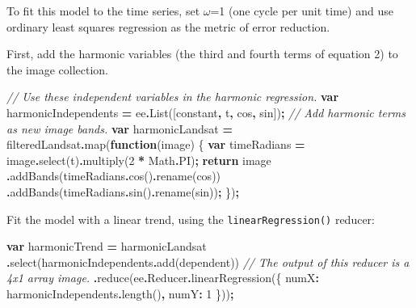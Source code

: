 \documentclass[
]{article}
\newenvironment{Shaded}{\begin{snugshade}}{\end{snugshade}}
\newcommand{\AttributeTok}[1]{\textcolor[rgb]{0.77,0.63,0.00}{#1}}
\newcommand{\BuiltInTok}[1]{#1}
\newcommand{\CommentTok}[1]{\textcolor[rgb]{0.56,0.35,0.01}{\textit{#1}}}
\newcommand{\ConstantTok}[1]{\textcolor[rgb]{0.00,0.00,0.00}{#1}}
\newcommand{\ControlFlowTok}[1]{\textcolor[rgb]{0.13,0.29,0.53}{\textbf{#1}}}
\newcommand{\DataTypeTok}[1]{\textcolor[rgb]{0.13,0.29,0.53}{#1}}
\newcommand{\DecValTok}[1]{\textcolor[rgb]{0.00,0.00,0.81}{#1}}
\newcommand{\FunctionTok}[1]{\textcolor[rgb]{0.00,0.00,0.00}{#1}}
\newcommand{\KeywordTok}[1]{\textcolor[rgb]{0.13,0.29,0.53}{\textbf{#1}}}
\newcommand{\NormalTok}[1]{#1}
\newcommand{\OperatorTok}[1]{\textcolor[rgb]{0.81,0.36,0.00}{\textbf{#1}}}
\newcommand{\StringTok}[1]{\textcolor[rgb]{0.31,0.60,0.02}{#1}}
\begin{document}
To fit this model to the time series, set \(\omega\)=1 (one cycle per unit time) and use ordinary least squares regression as the metric of error reduction.

First, add the harmonic variables (the third and fourth terms of equation 2) to the image collection.

\begin{Shaded}
\begin{Highlighting}[]
\CommentTok{// Use these independent variables in the harmonic regression.}
\KeywordTok{var}\NormalTok{ harmonicIndependents }\OperatorTok{=}\NormalTok{ ee}\OperatorTok{.}\FunctionTok{List}\NormalTok{([}\StringTok{\textquotesingle{}constant\textquotesingle{}}\OperatorTok{,} \StringTok{\textquotesingle{}t\textquotesingle{}}\OperatorTok{,} \StringTok{\textquotesingle{}cos\textquotesingle{}}\OperatorTok{,} \StringTok{\textquotesingle{}sin\textquotesingle{}}\NormalTok{])}\OperatorTok{;}
\CommentTok{// Add harmonic terms as new image bands.}
\KeywordTok{var}\NormalTok{ harmonicLandsat }\OperatorTok{=}\NormalTok{ filteredLandsat}\OperatorTok{.}\FunctionTok{map}\NormalTok{(}\KeywordTok{function}\NormalTok{(image) \{}
  \KeywordTok{var}\NormalTok{ timeRadians }\OperatorTok{=}\NormalTok{ image}\OperatorTok{.}\FunctionTok{select}\NormalTok{(}\StringTok{\textquotesingle{}t\textquotesingle{}}\NormalTok{)}\OperatorTok{.}\FunctionTok{multiply}\NormalTok{(}\DecValTok{2} \OperatorTok{*} \BuiltInTok{Math}\OperatorTok{.}\ConstantTok{PI}\NormalTok{)}\OperatorTok{;}
    \ControlFlowTok{return}\NormalTok{ image}
      \OperatorTok{.}\FunctionTok{addBands}\NormalTok{(timeRadians}\OperatorTok{.}\FunctionTok{cos}\NormalTok{()}\OperatorTok{.}\FunctionTok{rename}\NormalTok{(}\StringTok{\textquotesingle{}cos\textquotesingle{}}\NormalTok{))}
      \OperatorTok{.}\FunctionTok{addBands}\NormalTok{(timeRadians}\OperatorTok{.}\FunctionTok{sin}\NormalTok{()}\OperatorTok{.}\FunctionTok{rename}\NormalTok{(}\StringTok{\textquotesingle{}sin\textquotesingle{}}\NormalTok{))}\OperatorTok{;}
\NormalTok{  \})}\OperatorTok{;}
\end{Highlighting}
\end{Shaded}

Fit the model with a linear trend, using the \texttt{linearRegression()} reducer:

\begin{Shaded}
\begin{Highlighting}[]
\KeywordTok{var}\NormalTok{ harmonicTrend }\OperatorTok{=}\NormalTok{ harmonicLandsat}
  \OperatorTok{.}\FunctionTok{select}\NormalTok{(harmonicIndependents}\OperatorTok{.}\FunctionTok{add}\NormalTok{(dependent))}
  \CommentTok{// The output of this reducer is a 4x1 array image.}
  \OperatorTok{.}\FunctionTok{reduce}\NormalTok{(ee}\OperatorTok{.}\AttributeTok{Reducer}\OperatorTok{.}\FunctionTok{linearRegression}\NormalTok{(\{}
  \DataTypeTok{numX}\OperatorTok{:}\NormalTok{ harmonicIndependents}\OperatorTok{.}\FunctionTok{length}\NormalTok{()}\OperatorTok{,} 
  \DataTypeTok{numY}\OperatorTok{:} \DecValTok{1}
\NormalTok{  \}))}\OperatorTok{;}
\end{Highlighting}
\end{Shaded}
\end{document}
